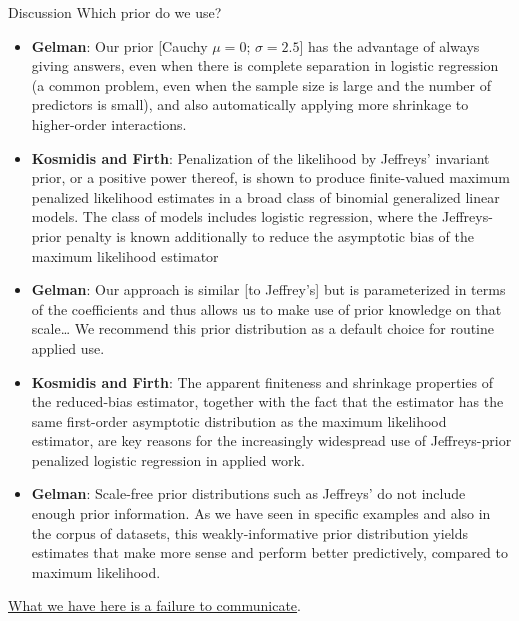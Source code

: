 \documentclass[
  ignorenonframetext,
]{beamer}
\providecommand{\tightlist}{%
  \setlength{\itemsep}{0pt}\setlength{\parskip}{0pt}}
\begin{document}
\begin{frame}{Discussion}
\protect\hypertarget{discussion}{}
Which prior do we use?

\vspace{12pt}

\begin{itemize}
\tightlist
\item
  \textbf{Gelman}: Our prior {[}Cauchy \(\mu =0\); \(\sigma = 2.5\){]}
  has the advantage of always giving answers, even when there is
  complete separation in logistic regression (a common problem, even
  when the sample size is large and the number of predictors is small),
  and also automatically applying more shrinkage to higher-order
  interactions.
\item
  \textbf{Kosmidis and Firth}: Penalization of the likelihood by
  Jeffreys' invariant prior, or a positive power thereof, is shown to
  produce finite-valued maximum penalized likelihood estimates in a
  broad class of binomial generalized linear models. The class of models
  includes logistic regression, where the Jeffreys-prior penalty is
  known additionally to reduce the asymptotic bias of the maximum
  likelihood estimator
\end{itemize}
\end{frame}

\begin{frame}{}
\protect\hypertarget{section-32}{}
\begin{itemize}
\tightlist
\item
  \textbf{Gelman}: Our approach is similar {[}to Jeffrey's{]} but is
  parameterized in terms of the coefficients and thus allows us to make
  use of prior knowledge on that scale\ldots{} We recommend this prior
  distribution as a default choice for routine applied use.
\item
  \textbf{Kosmidis and Firth}: The apparent finiteness and shrinkage
  properties of the reduced-bias estimator, together with the fact that
  the estimator has the same first-order asymptotic distribution as the
  maximum likelihood estimator, are key reasons for the increasingly
  widespread use of Jeffreys-prior penalized logistic regression in
  applied work.
\item
  \textbf{Gelman}: Scale-free prior distributions such as Jeffreys' do
  not include enough prior information. As we have seen in specific
  examples and also in the corpus of datasets, this weakly-informative
  prior distribution yields estimates that make more sense and perform
  better predictively, compared to maximum likelihood.
\end{itemize}

\vspace{12pt}

\href{https://www.youtube.com/watch?v=V2f-MZ2HRHQ}{What we have here is
a failure to communicate}.
\end{frame}
\end{document}
